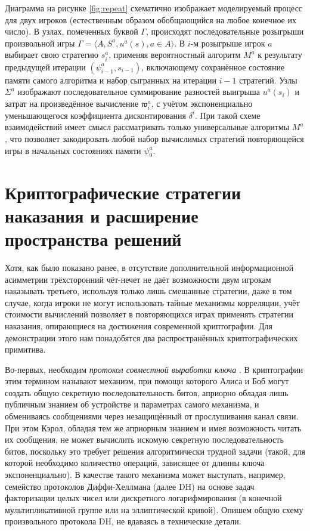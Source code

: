 Диаграмма на рисунке \ref{fig:repeat} схематично изображает моделируемый процесс для двух игроков (естественным образом обобщающийся на любое конечное их число). В узлах, помеченных буквой $\Gamma$, происходят последовательные розыгрыши произвольной игры $\Gamma = \langle A, S^a, u^a(s), a \in A \rangle$. В $i$-м розыгрыше игрок $a$ выбирает свою стратегию $s^a_i$, применяя вероятностный алгоритм $M^a$ к результату предыдущей итерации $(\psi^a_{i-1}, s_{i-1})$, включающему сохранённое состояние памяти самого алгоритма и набор сыгранных на итерации $i-1$ стратегий. Узлы $\Sigma^a$ изображают последовательное суммирование разностей выигрыша $u^a(s_i)$ и затрат на произведённое вычисление $\mathfrak{w}^a_i$, с учётом экспоненциально уменьшающегося коэффициента дисконтирования $\delta^i$. При такой схеме взаимодействий имеет смысл рассматривать только универсальные алгоритмы $M^a$, что позволяет закодировать любой набор вычислимых стратегий повторяющейся игры в начальных состояниях памяти $\psi^a_0$.

\section{Криптографические стратегии наказания и расширение пространства решений}\label{sec:ch3/sect4}

Хотя, как было показано ранее, в отсутствие дополнительной информационной асимметрии трёхсторонний чёт-нечет не даёт возможности двум игрокам наказывать третьего, используя только лишь смешанные стратегии, даже в том случае, когда игроки не могут использовать тайные механизмы корреляции, учёт стоимости вычислений позволяет в повторяющихся играх применять стратегии наказания, опирающиеся на достижения современной криптографии. Для демонстрации этого нам понадобятся два распространённых криптографических примитива.

Во-первых, необходим \emph{протокол совместной выработки ключа} \cite{Boyd}. В криптографии этим термином называют механизм, при помощи которого Алиса и Боб могут создать общую секретную последовательность битов, априорно обладая лишь публичным знанием об устройстве и параметрах самого механизма, и обмениваясь сообщениями через незащищённый от прослушивания канал связи. При этом Кэрол, обладая тем же априорным знанием и имея возможность читать их сообщения, не может вычислить искомую секретную последовательность битов, поскольку это требует решения алгоритмически трудной задачи (такой, для которой необходимо количество операций, зависящее от длинны ключа экспоненциально). В качестве такого механизма может выступать, например, семейство протоколов Диффи-Хеллмана (далее DH) на основе задач факторизации целых чисел или дискретного логарифмирования (в конечной мультипликативной группе или на эллиптической кривой). Опишем общую схему произвольного протокола DH, не вдаваясь в технические детали.

